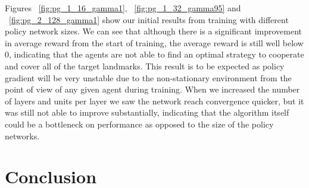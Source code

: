 \documentclass{article}
\begin{document}
Figures ~\ref{fig:pg_1_16_gamma1}, ~\ref{fig:pg_1_32_gamma95}  and ~\ref{fig:pg_2_128_gamma1} show our initial results from training with different policy network sizes. We can see that although there is a significant improvement in average reward from the start of training, the average reward is still well below 0, indicating that the agents are not able to find an optimal strategy to cooperate and cover all of the target landmarks. This result is to be expected as policy gradient will be very unstable due to the non-stationary environment from the point of view of any given agent during training. When we increased the number of layers and units per layer we saw the network reach convergence quicker, but it was still not able to improve substantially, indicating that the algorithm itself could be a bottleneck on performance as opposed to the size of the policy networks.

\section{Conclusion}




\end{document}
